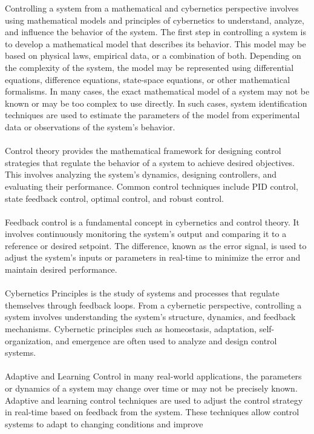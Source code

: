 \documentclass[12pt]{report}
\begin{document}
Controlling a system from a mathematical and cybernetics perspective involves using
mathematical models and principles of cybernetics to understand, analyze, and influence
the behavior of the system. The first step in controlling a system is to develop a mathematical
model that describes its behavior. This model may be based on physical laws, empirical
data, or a combination of both. Depending on the complexity of the system, the model may
be represented using differential equations, difference equations, state-space equations, or
other mathematical formalisms. In many cases, the exact mathematical model of a system may not
be known or may be too complex to use directly. In such cases, system identification
techniques are used to estimate the parameters of the model from experimental data or
observations of the system's behavior.\\
\\
Control theory provides the mathematical framework for designing control strategies that
regulate the behavior of a system to achieve desired objectives. This involves analyzing the
system's dynamics, designing controllers, and evaluating their performance. Common control
techniques include PID control, state feedback control, optimal control, and robust control.\\
\\
Feedback control is a fundamental concept in cybernetics and control theory. It involves
continuously monitoring the system's output and comparing it to a reference or desired
setpoint. The difference, known as the error signal, is used to adjust the system's inputs
or parameters in real-time to minimize the error and maintain desired performance.\\
\\
Cybernetics Principles is the study of systems and processes that regulate themselves
through feedback loops. From a cybernetic perspective, controlling a system involves
understanding the system's structure, dynamics, and feedback mechanisms. Cybernetic
principles such as homeostasis, adaptation, self-organization, and emergence are often
used to analyze and design control systems.\\
\\
Adaptive and Learning Control in many real-world applications, the parameters or dynamics
of a system may change over time or may not be precisely known. Adaptive and learning control
techniques are used to adjust the control strategy in real-time based on feedback from the
system. These techniques allow control systems to adapt to changing conditions and improve
\end{document}
